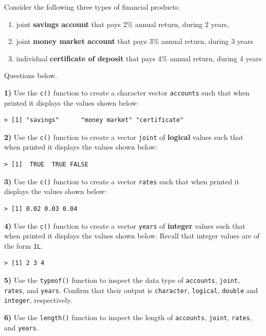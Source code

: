 \documentclass[
]{book}
\begin{document}
Consider the following three types of financial products:

\begin{enumerate}
\def\labelenumi{\alph{enumi})}
\item
  joint \textbf{savings account} that pays 2\% annual return, during 2 years,
\item
  joint \textbf{money market account} that pays 3\% annual return, during 3 years
\item
  individual \textbf{certificate of deposit} that pays 4\% annual return, during 4 years
\end{enumerate}

Questions below.

\textbf{1)} Use the \texttt{c()} function to create a character vector \texttt{accounts} such
that when printed it displays the values shown below:

\begin{verbatim}
> [1] "savings"      "money market" "certificate"
\end{verbatim}

\textbf{2)} Use the \texttt{c()} function to create a vector \texttt{joint} of \textbf{logical} values
such that when printed it displays the values shown below:

\begin{verbatim}
> [1]  TRUE  TRUE FALSE
\end{verbatim}

\textbf{3)} Use the \texttt{c()} function to create a vector \texttt{rates} such that when
printed it displays the values shown below:

\begin{verbatim}
> [1] 0.02 0.03 0.04
\end{verbatim}

\textbf{4)} Use the \texttt{c()} function to create a vector \texttt{years} of \textbf{integer}
values such that when printed it displays the values shown below. Recall
that integer values are of the form \texttt{1L}.

\begin{verbatim}
> [1] 2 3 4
\end{verbatim}

\textbf{5)} Use the \texttt{typeof()} function to inspect the data type of \texttt{accounts},
\texttt{joint}, \texttt{rates}, and \texttt{years}. Confirm that their output is \texttt{character},
\texttt{logical}, \texttt{double} and \texttt{integer}, respectively.

\textbf{6)} Use the \texttt{length()} function to inspect the length of \texttt{accounts},
\texttt{joint}, \texttt{rates}, and \texttt{years}.
\end{document}
